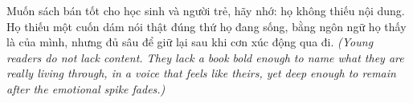 \begin{baihoc}
Muốn sách bán tốt cho học sinh và người trẻ, hãy nhớ: họ không thiếu nội dung. Họ thiếu một cuốn dám nói thật đúng thứ họ đang sống, bằng ngôn ngữ họ thấy là của mình, nhưng đủ sâu để giữ lại sau khi cơn xúc động qua đi.
\textit{(Young readers do not lack content. They lack a book bold enough to name what they are really living through, in a voice that feels like theirs, yet deep enough to remain after the emotional spike fades.)}
\end{baihoc}
